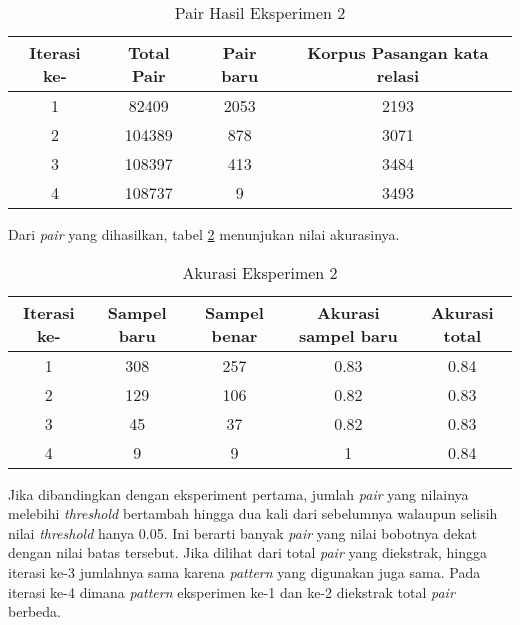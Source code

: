 \begin{table}
  \centering
  \caption{Pair Hasil Eksperimen 2}
  \label{table:eksp2-pair}
  \begin{tabular}{|c|c|c|c|}
  \hline
  Iterasi ke-  & Total Pair & Pair baru & Korpus Pasangan kata relasi \\ \hline
  1 & 82409 & 2053 & 2193 \\ \hline
  2 & 104389 & 878 & 3071 \\ \hline
  3 & 108397 & 413 & 3484 \\ \hline
  4 & 108737 & 9 & 3493 \\ \hline
  \end{tabular} 
\end{table}

\noindent Dari \textit{pair} yang dihasilkan, tabel \ref{table:eksp2-akurasi} menunjukan nilai akurasinya.

\begin{table}
  \centering
  \caption{Akurasi Eksperimen 2}
  \label{table:eksp2-akurasi}
  \begin{tabular}{|c|c|c|c|c|}
  \hline
  Iterasi ke- & Sampel baru & Sampel benar & Akurasi sampel baru & Akurasi total \\ \hline
  1 & 308 & 257 & 0.83 & 0.84 \\ \hline
  2 & 129 & 106 & 0.82 & 0.83 \\ \hline
  3 & 45 & 37 & 0.82 & 0.83 \\ \hline
  4 & 9 & 9 & 1 & 0.84 \\ \hline
  \end{tabular} 
\end{table}

\noindent Jika dibandingkan dengan eksperiment pertama, jumlah \textit{pair} yang nilainya melebihi \textit{threshold} bertambah hingga dua kali dari sebelumnya walaupun selisih nilai \textit{threshold} hanya 0.05. Ini berarti banyak \textit{pair} yang nilai bobotnya dekat dengan nilai batas tersebut. Jika dilihat dari total \textit{pair} yang diekstrak, hingga iterasi ke-3 jumlahnya sama karena \textit{pattern} yang digunakan juga sama. Pada iterasi ke-4 dimana \textit{pattern} eksperimen ke-1 dan ke-2 diekstrak total \textit{pair} berbeda.

